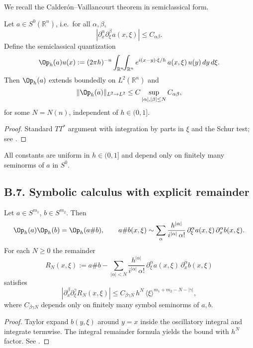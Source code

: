 We recall the Calder\'on–Vaillancourt theorem in semiclassical form.

\begin{theorem}
\label{thm:CV}
Let $a\in S^0(\mathbb{R}^n)$, i.e.\ for all $\alpha,\beta$,
\[
|\partial_x^\alpha \partial_\xi^\beta a(x,\xi)| \le C_{\alpha\beta}.
\]
Define the semiclassical quantization
\[
\Op_h(a)u(x) := (2\pi h)^{-n}\int_{\mathbb{R}^n}\!\!\int_{\mathbb{R}^n}
e^{i(x-y)\cdot \xi/h}\, a(x,\xi)\, u(y)\,dy\,d\xi.
\]
Then $\Op_h(a)$ extends boundedly on $L^2(\mathbb{R}^n)$ and
\[
\|\Op_h(a)\|_{L^2\to L^2} \le C \sup_{|\alpha|,|\beta|\le N} C_{\alpha\beta},
\]
for some $N=N(n)$, independent of $h\in(0,1]$.
\end{theorem}

\begin{proof}
Standard $TT^*$ argument with integration by parts in $\xi$ and the Schur test; see \cite[Thm.~4.23]{Zworski}.
\end{proof}

\begin{remark}
All constants are uniform in $h\in(0,1]$ and depend only on finitely many seminorms of $a$ in $S^0$.
\end{remark}

\subsection*{B.7. Symbolic calculus with explicit remainder}
\label{appB:symbolic}

\begin{theorem}
\label{thm:symbol-composition}
Let $a\in S^{m_1}$, $b\in S^{m_2}$. Then
\[
\Op_h(a)\Op_h(b) = \Op_h(a\# b),\qquad
a\# b(x,\xi) \sim \sum_{\alpha}\frac{h^{|\alpha|}}{i^{|\alpha|}\,\alpha!}\,
\partial_\xi^\alpha a(x,\xi)\,\partial_x^\alpha b(x,\xi).
\]
For each $N\ge0$ the remainder
\[
R_N(x,\xi) := a\# b - \sum_{|\alpha|<N}\frac{h^{|\alpha|}}{i^{|\alpha|}\,\alpha!}\,
\partial_\xi^\alpha a(x,\xi)\,\partial_x^\alpha b(x,\xi)
\]
satisfies
\[
|\partial_x^\beta \partial_\xi^\gamma R_N(x,\xi)| \le C_{\beta\gamma N}\,
h^N\, \langle \xi\rangle^{m_1+m_2-N-|\gamma|},
\]
where $C_{\beta\gamma N}$ depends only on finitely many symbol seminorms of $a,b$.
\end{theorem}

\begin{proof}
Taylor expand $b(y,\xi)$ around $y=x$ inside the oscillatory integral and integrate termwise. The integral remainder formula yields the bound with $h^N$ factor. See \cite[§4.2]{Zworski}.
\end{proof}

